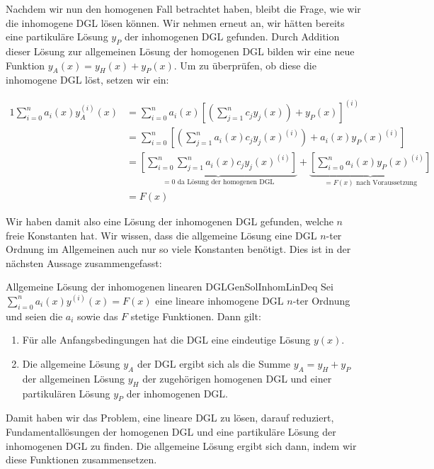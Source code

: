 Nachdem wir nun den homogenen Fall betrachtet haben, bleibt die Frage, wie wir die inhomogene DGL lösen können. Wir nehmen erneut an, wir hätten bereits eine partikuläre Lösung $y_P$ der inhomogenen DGL gefunden. Durch Addition dieser Lösung zur allgemeinen Lösung der homogenen DGL bilden wir eine neue Funktion $y_A(x) = y_H(x) + y_P(x)$. Um zu überprüfen, ob diese die inhomogene DGL löst, setzen wir ein:

\begin{alignat*}{1}
    \sum\limits_{i=0}^n a_i(x) y_A^{(i)}(x) &= \sum\limits_{i=0}^n a_i(x) \left[\left(\sum\limits_{j=1}^n c_j y_j(x)\right) + y_P(x)\right]^{(i)} \\
                                            &= \sum\limits_{i=0}^n \left[ \left(\sum\limits_{j=1}^n a_i(x) c_j y_j(x)^{(i)} \right) + a_i(x) y_P(x)^{(i)} \right] \\
                                            &=  \underbrace{\left[ \sum\limits_{i=0}^n \sum\limits_{j=1}^n a_i(x) c_j y_j(x)^{(i)} \right]}_{=0 \text{ da Lösung der homogenen DGL}} +  \underbrace{\left[ \sum\limits_{i=0}^n a_i(x) y_P(x)^{(i)}  \right]}_{=F(x) \text{ nach Voraussetzung}} \\
                                            &= F(x)
\end{alignat*}

Wir haben damit also eine Lösung der inhomogenen DGL gefunden, welche $n$ freie Konstanten hat. Wir wissen, dass die allgemeine Lösung eine DGL $n$-ter Ordnung im Allgemeinen auch nur so viele Konstanten benötigt. Dies ist in der nächsten Aussage zusammengefasst:

\begin{statement}{Allgemeine Lösung der inhomogenen linearen DGL}{GenSolInhomLinDeq}
    Sei $\sum\limits_{i=0}^n a_i(x) y^{(i)}(x) = F(x)$ eine lineare inhomogene DGL $n$-ter Ordnung und seien die $a_i$ sowie das $F$ stetige Funktionen. Dann gilt:
    \begin{enumerate}
        \item Für alle Anfangsbedingungen hat die DGL eine eindeutige Lösung $y(x)$.
        \item Die allgemeine Lösung $y_A$ der DGL ergibt sich als die Summe $y_A = y_H + y_P$ der allgemeinen Lösung $y_H$ der zugehörigen homogenen DGL und einer partikulären Lösung $y_P$ der inhomogenen DGL.
    \end{enumerate}
\end{statement}

Damit haben wir das Problem, eine lineare DGL zu lösen, darauf reduziert, Fundamentallösungen der homogenen DGL und eine partikuläre Lösung der inhomogenen DGL zu finden. Die allgemeine Lösung ergibt sich dann, indem wir diese Funktionen zusammensetzen.

